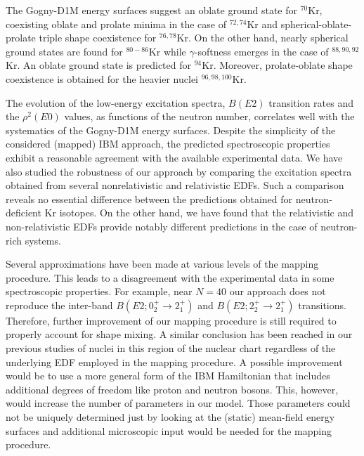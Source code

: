 \documentclass[twocolumn,showpacs,amsmath,amssymb,superscriptaddress]{revtex4-1}
\begin{document}
The Gogny-D1M energy surfaces suggest an oblate ground state for 
$^{70}$Kr, coexisting oblate and prolate minima in the case of 
$^{72,74}$Kr and spherical-oblate-prolate triple shape coexistence for 
$^{76,78}$Kr. On the other hand, nearly spherical ground states are 
found for $^{80-86}$Kr while $\gamma$-softness emerges in the case of
 $^{88,90,92}$Kr. An oblate ground state is predicted for 
$^{94}$Kr. Moreover, prolate-oblate shape coexistence 
is obtained for the heavier nuclei
$^{96,98,100}$Kr.


The evolution of the  low-energy excitation spectra, $B(E2)$ transition 
rates and the $\rho^{2}(E0)$ values, as functions of the neutron 
number,  correlates  well with the systematics of the Gogny-D1M energy 
surfaces. Despite the simplicity of the considered (mapped) IBM 
approach, the predicted spectroscopic properties exhibit a reasonable 
agreement with the available experimental data. We have also studied 
the robustness of our approach by comparing the excitation spectra 
obtained from several nonrelativistic and relativistic EDFs. Such a 
comparison reveals no essential difference between the predictions 
obtained for neutron-deficient Kr isotopes. On the other hand, we have 
found that the relativistic and non-relativistic EDFs provide notably 
different predictions in the case of neutron-rich systems.  



Several approximations have been made  at various levels of the mapping 
procedure. This leads to a  disagreement with the  experimental data  
in some spectroscopic properties. For example, near $N=40$ our approach  
does not reproduce the inter-band $B(E2; 0^+_2\rightarrow 2^+_1)$ and 
$B(E2; 2^+_2\rightarrow 2^+_1)$ transitions. Therefore, further 
improvement of our mapping procedure is still required to properly 
account for shape mixing. A similar conclusion has been reached in our 
previous studies of nuclei in this region of the nuclear chart 
\cite{nomura2016zr,nomura2017ge} regardless of the underlying EDF 
employed in the mapping procedure. A possible improvement would be to 
use a more general form of the IBM Hamiltonian that includes additional 
degrees of freedom like proton and neutron bosons. This, however, would 
increase the number of parameters in our model. Those parameters could 
not be uniquely determined just by looking at the (static) mean-field 
energy surfaces and additional microscopic input would be needed for 
the mapping procedure. 
\end{document}
